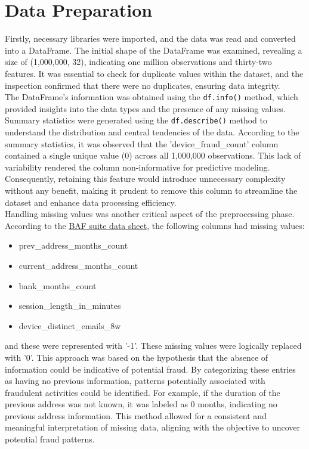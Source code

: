 \documentclass[12pt,a4paper]{report}
\begin{document}
\clearpage

\section{Data Preparation}
Firstly, necessary libraries were imported, and the data was read and converted into a DataFrame. The initial shape of the DataFrame was examined, revealing a size of (1,000,000, 32), indicating one million observations and thirty-two features. It was essential to check for duplicate values within the dataset, and the inspection confirmed that there were no duplicates, ensuring data integrity.\\

The DataFrame's information was obtained using the \texttt{df.info()} method, which provided insights into the data types and the presence of any missing values. Summary statistics were generated using the \texttt{df.describe()} method to understand the distribution and central tendencies of the data. According to the summary statistics, it was observed that the 'device\_fraud\_count' column contained a single unique value (0) across all 1,000,000 observations. This lack of variability rendered the column non-informative for predictive modeling. Consequently, retaining this feature would introduce unnecessary complexity without any benefit, making it prudent to remove this column to streamline the dataset and enhance data processing efficiency.\\

Handling missing values was another critical aspect of the preprocessing phase. According to the \href{https://github.com/feedzai/bank-account-fraud/blob/main/documents/datasheet.pdf}{BAF suite data sheet}, the following columns had missing values:
\begin{itemize}
    \item prev\_address\_months\_count
    \item current\_address\_months\_count
    \item bank\_months\_count
    \item session\_length\_in\_minutes
    \item device\_distinct\_emails\_8w
\end{itemize}
and these were represented with '-1'. These missing values were logically replaced with '0'. This approach was based on the hypothesis that the absence of information could be indicative of potential fraud. By categorizing these entries as having no previous information, patterns potentially associated with fraudulent activities could be identified. For example, if the duration of the previous address was not known, it was labeled as 0 months, indicating no previous address information. This method allowed for a consistent and meaningful interpretation of missing data, aligning with the objective to uncover potential fraud patterns.\\
\end{document}

